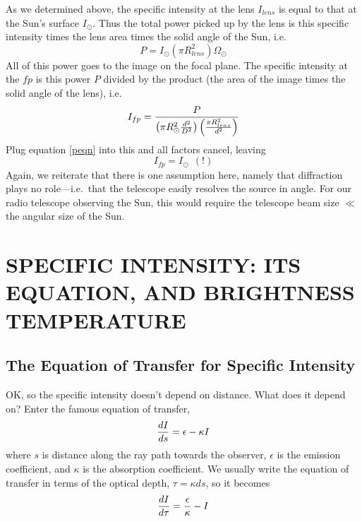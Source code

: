 \documentclass[12pt,psfig,preprint]{aastex}
\begin{document}
	As we determined above, the specific intensity at the lens
$I_{lens}$ is equal to that at the Sun's surface $I_\odot$. Thus the
total power picked up by the lens is this specific intensity times the
lens area times the solid angle of the Sun, i.e.
%
\begin{equation} \label{peqn}
P = I_\odot (\pi R_{lens}^2) \Omega_\odot
\end{equation}
%
\noindent All of this power goes to the image on the focal plane. The
specific intensity at the $fp$ is this power $P$ divided by the product
(the area of the image times the solid angle of the lens), i.e.
%
\begin{equation}
I_{fp} = { P \over \left( \pi R_\odot^2 {d^2 \over D^2} \right) 
\left( {\pi R_{lens}^2 \over d^2} \right) } 
\end{equation}
%
\noindent Plug equation \ref{peqn} into this and all factors cancel,
leaving
%
\begin{equation}
I_{fp} = I_\odot \ \ (!)
\end{equation}
%
Again, we reiterate that there is one assumption here, namely
that diffraction plays no role---i.e.\ that the telescope easily
resolves the source in angle.  For our radio telescope observing the
Sun, this would require the telescope beam size $\ll$ the angular size
of the Sun.

\section{SPECIFIC INTENSITY: ITS EQUATION, AND BRIGHTNESS TEMPERATURE}

\subsection {The Equation of Transfer for Specific Intensity}

OK, so the specific intensity doesn't depend on distance. What does it
depend on? Enter the famous equation of transfer,
%
\begin{equation} \label{xfer}
{dI \over ds} = \epsilon - \kappa I
\end{equation}
%
where $s$ is distance along the ray path towards the observer,
$\epsilon$ is the emission coefficient, and $\kappa$ is the absorption
coefficient. We usually write the equation of transfer in terms of the
optical depth, $\tau = \kappa ds$, so it becomes
%
\begin{equation} \label{xfertau}
{dI \over d\tau} = {\epsilon \over  \kappa} - I
\end{equation}
%
\end{document}

